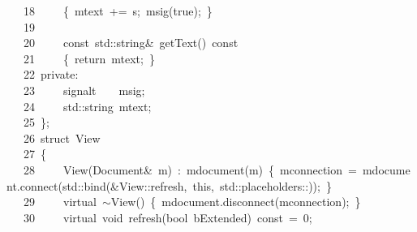 \documentclass[9pt,onside,a4paper]{article}
\newcommand{\hlstd}[1]{\textcolor[rgb]{0.2,0,0.4}{#1}}
\newcommand{\hlnum}[1]{\textcolor[rgb]{0.2,0.73,0.02}{#1}}
\newcommand{\hlopt}[1]{\textcolor[rgb]{0.33,0.33,0.33}{#1}}
\newcommand{\hllin}[1]{\textcolor[rgb]{0.6,0.6,0.6}{#1}}
\newcommand{\hlkwa}[1]{\textcolor[rgb]{1,0.19,0.19}{#1}}
\newcommand{\hlkwb}[1]{\textcolor[rgb]{0.96,0.55,0.14}{#1}}
\newcommand{\hlkwc}[1]{\textcolor[rgb]{0,0,1}{#1}}
\newcommand{\hlkwd}[1]{\textcolor[rgb]{0.82,0.11,0.93}{#1}}
\begin{document}
\hllin{\ \ \ 18\ }\hlstd{}\hlstd{\ \ \ \ }\hlstd{}\hlopt{\{\ }\hlstd{m\textunderscore text\ }\hlopt{+=\ }\hlstd{s}\hlopt{;\ }\hlstd{}\hlkwd{m\textunderscore sig}\hlstd{}\hlopt{(}\hlstd{}\hlkwa{true}\hlstd{}\hlopt{);\ \}}\\
\hllin{\ \ \ 19\ }\hlstd{\\
\hllin{\ \ \ 20\ }}\hlstd{\ \ \ \ }\hlstd{}\hlkwb{const\ }\hlstd{std}\hlopt{::}\hlstd{string}\hlopt{\&\ }\hlstd{}\hlkwd{getText}\hlstd{}\hlopt{()\ }\hlstd{}\hlkwb{const}\\
\hllin{\ \ \ 21\ }\hlstd{}\hlstd{\ \ \ \ }\hlstd{}\hlopt{\{\ }\hlstd{}\hlkwa{return\ }\hlstd{m\textunderscore text}\hlopt{;\ \}}\\
\hllin{\ \ \ 22\ }\hlstd{}\hlkwc{private}\hlstd{}\hlopt{:}\\
\hllin{\ \ \ 23\ }\hlstd{}\hlstd{\ \ \ \ }\hlstd{signal\textunderscore t}\hlstd{\ \ \ \ }\hlstd{m\textunderscore sig}\hlopt{;}\\
\hllin{\ \ \ 24\ }\hlstd{}\hlstd{\ \ \ \ }\hlstd{std}\hlopt{::}\hlstd{string\ m\textunderscore text}\hlopt{;}\\
\hllin{\ \ \ 25\ }\hlstd{}\hlopt{\};}\\
\hllin{\ \ \ 26\ }\hlstd{}\hlkwb{struct\ }\hlstd{View}\\
\hllin{\ \ \ 27\ }\hlopt{\{}\\
\hllin{\ \ \ 28\ }\hlstd{}\hlstd{\ \ \ \ }\hlstd{}\hlkwd{View}\hlstd{}\hlopt{(}\hlstd{Document}\hlopt{\&\ }\hlstd{m}\hlopt{)\ :\ }\hlstd{}\hlkwd{m\textunderscore document}\hlstd{}\hlopt{(}\hlstd{m}\hlopt{)\ \{\ }\hlstd{m\textunderscore connection\ }\hlopt{=\ }\hlstd{m\textunderscore document}\hlopt{.}\hlstd{}\hlkwd{connect}\hlstd{}\hlopt{(}\hlstd{std}\hlopt{::}\hlstd{}\hlkwd{bind}\hlstd{}\hlopt{(\&}\hlstd{View}\hlopt{::}\hlstd{refresh}\hlopt{,\ }\hlstd{}\hlkwa{this}\hlstd{}\hlopt{,\ }\hlstd{std}\hlopt{::}\hlstd{placeholders}\hlopt{::}\hlstd{}\hlopt{));\ \}}\\
\hllin{\ \ \ 29\ }\hlstd{}\hlstd{\ \ \ \ }\hlstd{}\hlkwc{virtual\ }\hlstd{}\hlopt{$\sim$}\hlstd{}\hlkwd{View}\hlstd{}\hlopt{()\ \{\ }\hlstd{m\textunderscore document}\hlopt{.}\hlstd{}\hlkwd{disconnect}\hlstd{}\hlopt{(}\hlstd{m\textunderscore connection}\hlopt{);\ \}}\\
\hllin{\ \ \ 30\ }\hlstd{}\hlstd{\ \ \ \ }\hlstd{}\hlkwc{virtual\ }\hlstd{}\hlkwb{void\ }\hlstd{}\hlkwd{refresh}\hlstd{}\hlopt{(}\hlstd{}\hlkwb{bool\ }\hlstd{bExtended}\hlopt{)\ }\hlstd{}\hlkwb{const\ }\hlstd{}\hlopt{=\ }\hlstd{}\hlnum{0}\hlstd{}\hlopt{;}\\
\end{document}

